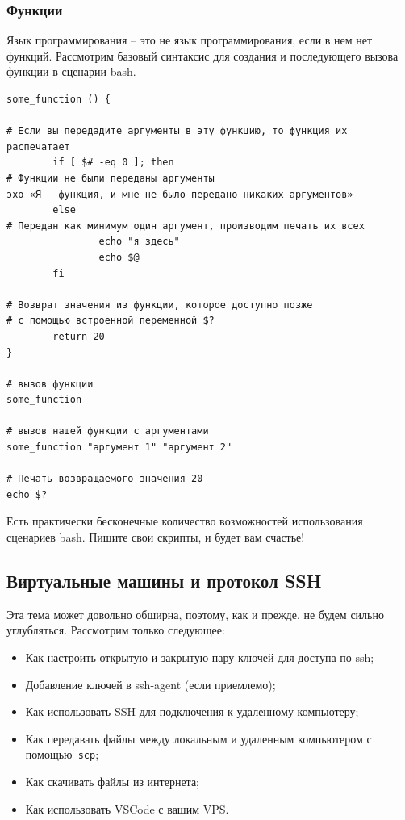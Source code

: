 \documentclass[12pt]{article}
\providecommand{\tightlist}{%
  \setlength{\itemsep}{0pt}\setlength{\parskip}{0pt}}
\begin{document}
\hypertarget{Functions}{%
\subsubsection{\texorpdfstring{\protect\hyperlink{Functions}{}Функции}{Функции}}\label{Functions}}

Язык программирования -- это не язык программирования, если в нем нет
функций. Рассмотрим базовый синтаксис для создания и последующего вызова
функции в сценарии bash.

\begin{verbatim}
some_function () {

# Если вы передадите аргументы в эту функцию, то функция их распечатает
        if [ $# -eq 0 ]; then
# Функции не были переданы аргументы
эхо «Я - функция, и мне не было передано никаких аргументов»
        else
# Передан как минимум один аргумент, производим печать их всех
                echo "я здесь"
                echo $@
        fi

# Возврат значения из функции, которое доступно позже
# с помощью встроенной переменной $?
        return 20
}

# вызов функции
some_function

# вызов нашей функции с аргументами
some_function "аргумент 1" "аргумент 2"

# Печать возвращаемого значения 20
echo $?
\end{verbatim}

Есть практически бесконечные количество возможностей использования
сценариев bash. Пишите свои скрипты, и будет вам счастье!

\hypertarget{Virtual-Machines-and-SSH-Protocol}{%
\subsection{\texorpdfstring{\protect\hyperlink{Virtual-Machines-and-SSH-Protocol}{}Виртуальные
машины и протокол
SSH}{Виртуальные машины и протокол SSH}}\label{Virtual-Machines-and-SSH-Protocol}}

Эта тема может довольно обширна, поэтому, как и прежде, не будем сильно
углубляться. Рассмотрим только следующее:

\begin{itemize}
\tightlist
\item
  Как настроить открытую и закрытую пару ключей для доступа по ssh;
\item
  Добавление ключей в ssh-agent (если приемлемо);
\item
  Как использовать SSH для подключения к удаленному компьютеру;
\item
  Как передавать файлы между локальным и удаленным компьютером с
  помощью\texttt{\ scp};
\item
  Как скачивать файлы из интернета;
\item
  Как использовать VSCode с вашим VPS.
\end{itemize}
\end{document}
